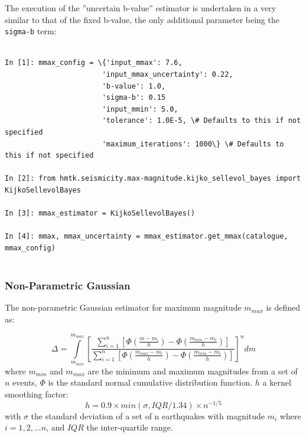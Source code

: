 The execution of the ''uncertain b-value'' estimator is undertaken in a very similar to that of the fixed b-value, the only additional parameter being the \verb=sigma-b= term:

\begin{Verbatim}[frame=single, commandchars=\\\{\}, fontsize=\scriptsize]

In [1]: mmax_config = \{'input_mmax': 7.6,
                       'input_mmax_uncertainty': 0.22,
                       'b-value': 1.0,
                       'sigma-b': 0.15
                       'input_mmin': 5.0,
                       'tolerance': 1.0E-5, \# Defaults to this if not specified
                       'maximum_iterations': 1000\} \# Defaults to this if not specified
                       
In [2]: from hmtk.seismicity.max-magnitude.kijko_sellevol_bayes import KijkoSellevolBayes

In [3]: mmax_estimator = KijkoSellevolBayes()

In [4]: mmax, mmax_uncertainty = mmax_estimator.get_mmax(catalogue, mmax_config)
                
\end{Verbatim}

\subsubsection{Non-Parametric Gaussian}

The non-parametric Gaussian estimator for maximum magnitude $m_{max}$ is defined as:

\begin{equation}
\Delta = \int\limits_{m_{min}}^{m_{max}} \left[ {\frac{\sum_{i = 1}^{n} \left[ {\Phi \left( {\frac{m - m_i}{h}} \right) - \Phi \left( {\frac{m_{min} - m_i}{h}} \right)} \right]}{\sum_{i = 1}^{n} \left[ {\Phi \left( {\frac{m_{max} - m_i}{h}} \right) - \Phi \left( {\frac{m_{min} - m_i}{h}} \right)} \right]}} \right]^n  dm
\end{equation}
where $m_{min}$ and $m_{max}$ are the minimum and maximum magnitudes from a set of $n$ events, $\Phi$ is the standard normal cumulative distribution function. $h$ a kernel smoothing factor:
\begin{equation}
h = 0.9 \times min\left( {\sigma, IQR / 1.34} \right) \times n^{-1 / 5}
\end{equation}
with $\sigma$ the standard deviation of a set of n earthquakes with magnitude $m_{i}$ where $i = 1, 2, ... n$, and $IQR$ the inter-quartile range. 

